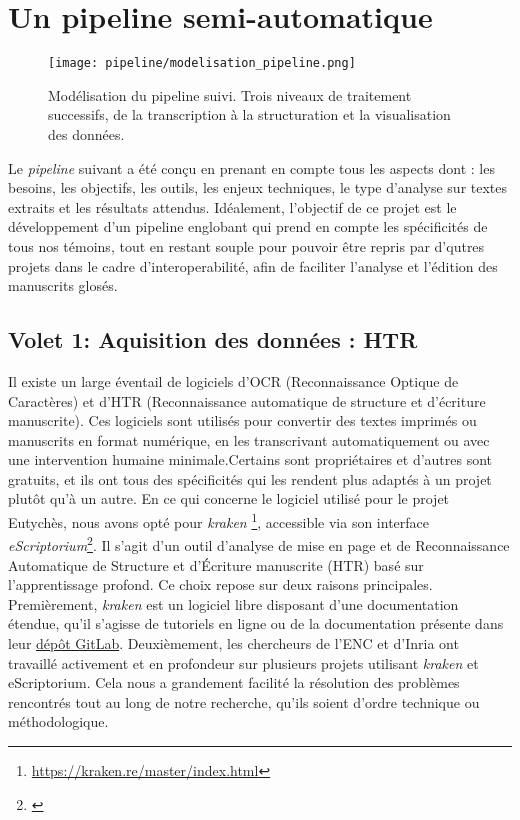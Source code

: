 \documentclass[a4paper, twoside, 12pt]{book}
\begin{document}
\chapter{Un pipeline semi-automatique}


\begin{figure}[H]
    \centering
    \texttt{[image: pipeline/modelisation\_pipeline.png]}
    \caption{Modélisation du pipeline suivi. Trois niveaux de traitement successifs, de la transcription à la structuration et la visualisation des données.}
\end{figure}

Le \textit{pipeline} suivant a été conçu en prenant en compte tous les aspects dont : les besoins, les objectifs, les outils, les enjeux techniques, le type d’analyse sur textes extraits et  les résultats attendus. Idéalement, l'objectif de ce projet est le développement d'un pipeline englobant qui prend en compte les spécificités de tous nos témoins, tout en restant souple pour pouvoir être repris par d'qutres projets dans le cadre d'interoperabilité, afin de faciliter l'analyse et l'édition des manuscrits glosés.

\section{Volet 1: Aquisition des données : HTR}

Il existe un large éventail de logiciels d'OCR (Reconnaissance Optique de Caractères) et d'HTR (Reconnaissance automatique de structure et d’écriture manuscrite). Ces logiciels sont utilisés pour convertir des textes imprimés ou manuscrits en format numérique, en les transcrivant automatiquement ou avec une intervention humaine minimale.Certains sont propriétaires et d'autres sont gratuits, et ils ont tous des spécificités qui les rendent plus adaptés à un projet plutôt qu'à un autre. En ce qui concerne le logiciel utilisé pour le projet Eutychès, nous avons opté pour \textit{kraken} \footnote{ \url{https://kraken.re/master/index.html}}, accessible via son interface \textit{eScriptorium}\footnote{\cite{kiessling2019escriptorium}}. Il s'agit d'un outil d’analyse de mise en page et de Reconnaissance Automatique de Structure et d’Écriture manuscrite (HTR) basé sur l'apprentissage profond. Ce choix repose sur deux raisons principales. Premièrement, \textit{kraken} est un logiciel libre disposant d'une documentation étendue, qu'il s'agisse de tutoriels en ligne ou de la documentation présente dans leur \href{https://gitlab.inria.fr/scripta/escriptorium}{dépôt GitLab}. Deuxièmement, les chercheurs de l'ENC et d'Inria ont travaillé activement et en profondeur sur plusieurs projets utilisant \textit{kraken} et eScriptorium. Cela nous a grandement facilité la résolution des problèmes rencontrés tout au long de notre recherche, qu'ils soient d'ordre technique ou méthodologique.
\end{document}
